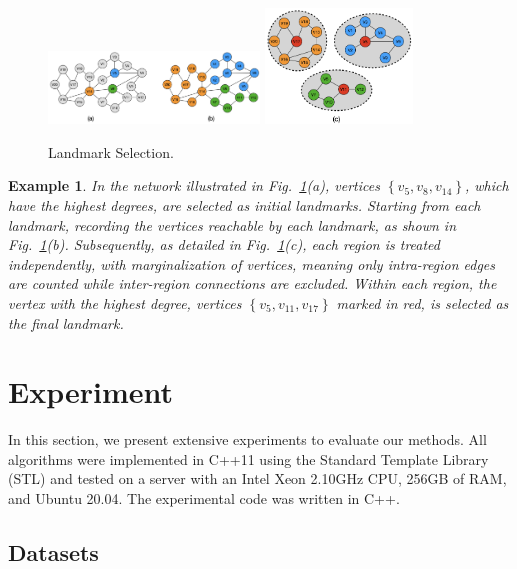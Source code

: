 \documentclass[sigconf]{acmart}
\newtheorem{example}{Example}
\begin{document}
%
%
\begin{figure}
\centering
\includegraphics[width=0.5\textwidth]{figures/5-1-landmark.png} 
\includegraphics[width=0.35\textwidth]{figures/5-2-lanbdmark.png}
\caption{Landmark Selection.} \label{fig6}
\end{figure}

\begin{example}
    In the network illustrated in Fig.~\ref{fig6}(a), vertices $\left \{ v_{5}, v_{8}, v_{14} \right \} $, which have the highest degrees, are selected as initial landmarks. Starting from each landmark, recording the vertices reachable by each landmark, as shown in Fig.~\ref{fig6}(b). Subsequently, as detailed in Fig.~\ref{fig6}(c), each region is treated independently, with marginalization of vertices, meaning only intra-region edges are counted while inter-region connections are excluded. Within each region, the vertex with the highest degree, vertices $\left \{ v_{5}, v_{11}, v_{17} \right \} $ marked in red, is selected as the final landmark.
\end{example}
%
%
\section{Experiment}
\label{sec:Experiment}
In this section, we present extensive experiments to evaluate our methods. All algorithms were implemented in C++11 using the Standard Template Library (STL) and tested on a server with an Intel Xeon 2.10GHz CPU, 256GB of RAM, and Ubuntu 20.04. The experimental code was written in C++.
\subsection{Datasets}
%
%
\end{document}
